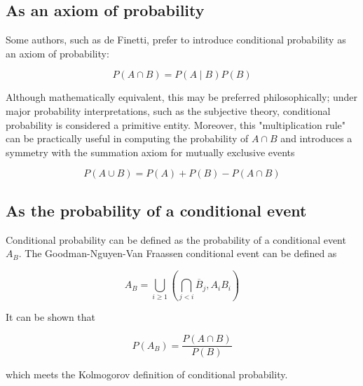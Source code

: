 \subsection{As an axiom of probability}
\label{sss:asan-3c65}




Some authors, such as de Finetti, prefer to introduce conditional probability as an axiom
of probability:



$$P(A \cap B) = P(A \mid B)P(B)$$



Although mathematically equivalent, this may be preferred philosophically; under major
probability interpretations, such as the subjective theory, conditional probability is
considered a primitive entity. Moreover, this "multiplication rule" can be practically
useful in computing the probability of $A \cap B$ and introduces a symmetry with the
summation axiom for mutually exclusive events



$$P(A \cup B) = P(A) + P(B) - P(A \cap B)$$




\subsection{As the probability of a conditional event}
\label{sss:asth-2fd0}




Conditional probability can be defined as the probability of a conditional event $A_B$.
The Goodman-Nguyen-Van Fraassen conditional event can be defined as



$$A _B = \bigcup _{i \ge 1} \left( \bigcap _{j < i} \overline{B} _j, A _i B _i \right)$$



It can be shown that



$$P(A _B)= \frac{P(A \cap B)}{P(B)}$$



which meets the Kolmogorov definition of conditional probability.




